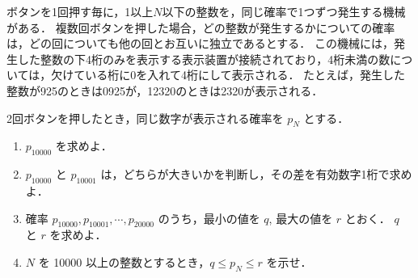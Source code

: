 \documentclass[../../main.tex]{subfiles}
\begin{document}
ボタンを1回押す毎に，1以上$N$以下の整数を，同じ確率で1つずつ発生する機械がある．
複数回ボタンを押した場合，どの整数が発生するかについての確率は，どの回についても他の回とお互いに独立であるとする．
この機械には，発生した整数の下4桁のみを表示する表示装置が接続されており，4桁未満の数については，欠けている桁に0を入れて4桁にして表示される．
たとえば，発生した整数が925のときは0925が，12320のときは2320が表示される．

2回ボタンを押したとき，同じ数字が表示される確率を $p_N$ とする．

\begin{enumerate}
  \item $p_{10000}$ を求めよ．
  \item $p_{10000}$ と $p_{10001}$ は，どちらが大きいかを判断し，その差を有効数字1桁で求めよ．
  \item 確率 $p_{10000}, p_{10001}, \cdots, p_{20000}$ のうち，最小の値を $q$, 最大の値を $r$ とおく． $q$ と
    $r$ を求めよ．
  \item $N$ を 10000 以上の整数とするとき，$q \leq p_N \leq r$ を示せ．
\end{enumerate}
\end{document}
